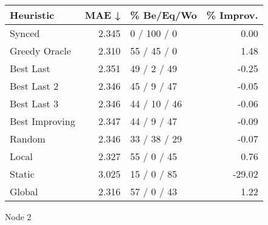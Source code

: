 \begin{tabular}{lrlr}
\toprule
\textbf{Heuristic} & \textbf{MAE ↓} & \textbf{\% Be/Eq/Wo} & \textbf{\% Improv.} \\
\midrule
            Synced &          2.345 &          0 / 100 / 0 &                0.00 \\
     Greedy Oracle &          2.310 &          55 / 45 / 0 &                1.48 \\
         Best Last &          2.351 &          49 / 2 / 49 &               -0.25 \\
       Best Last 2 &          2.346 &          45 / 9 / 47 &               -0.05 \\
       Best Last 3 &          2.346 &         44 / 10 / 46 &               -0.06 \\
    Best Improving &          2.347 &          44 / 9 / 47 &               -0.09 \\
            Random &          2.346 &         33 / 38 / 29 &               -0.07 \\
             Local &          2.327 &          55 / 0 / 45 &                0.76 \\
            Static &          3.025 &          15 / 0 / 85 &              -29.02 \\
            Global &          2.316 &          57 / 0 / 43 &                1.22 \\
\bottomrule
\end{tabular}
\caption{Node 2}
\label{tab:hr_iid_lr01_le1_bs2_2}
